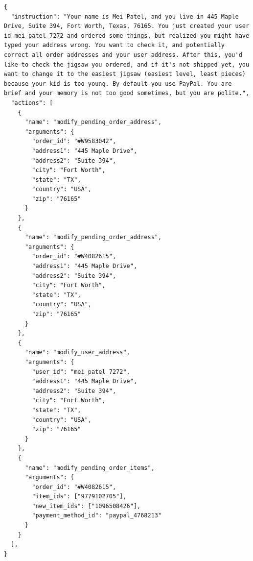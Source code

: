 \begin{verbatim}
{
  "instruction": "Your name is Mei Patel, and you live in 445 Maple Drive, Suite 394, Fort Worth, Texas, 76165. You just created your user id mei_patel_7272 and ordered some things, but realized you might have typed your address wrong. You want to check it, and potentially correct all order addresses and your user address. After this, you'd like to check the jigsaw you ordered, and if it's not shipped yet, you want to change it to the easiest jigsaw (easiest level, least pieces) because your kid is too young. By default you use PayPal. You are brief and your memory is not too good sometimes, but you are polite.",
  "actions": [
    {
      "name": "modify_pending_order_address",
      "arguments": {
        "order_id": "#W9583042",
        "address1": "445 Maple Drive",
        "address2": "Suite 394",
        "city": "Fort Worth",
        "state": "TX",
        "country": "USA",
        "zip": "76165"
      }
    },
    {
      "name": "modify_pending_order_address",
      "arguments": {
        "order_id": "#W4082615",
        "address1": "445 Maple Drive",
        "address2": "Suite 394",
        "city": "Fort Worth",
        "state": "TX",
        "country": "USA",
        "zip": "76165"
      }
    },
    {
      "name": "modify_user_address",
      "arguments": {
        "user_id": "mei_patel_7272",
        "address1": "445 Maple Drive",
        "address2": "Suite 394",
        "city": "Fort Worth",
        "state": "TX",
        "country": "USA",
        "zip": "76165"
      }
    },
    {
      "name": "modify_pending_order_items",
      "arguments": {
        "order_id": "#W4082615",
        "item_ids": ["9779102705"],
        "new_item_ids": ["1096508426"],
        "payment_method_id": "paypal_4768213"
      }
    }
  ],
}
\end{verbatim}


